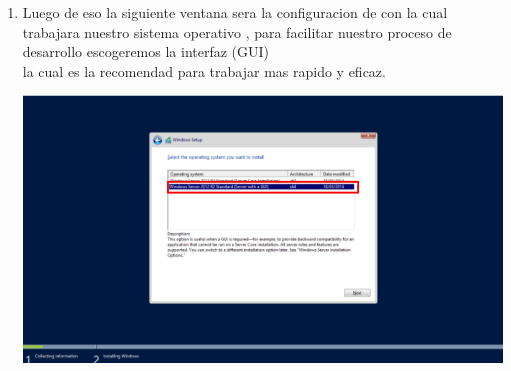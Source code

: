 \begin{enumerate}[1.]
	\item Luego de eso la siguiente ventana sera la configuracion de con la cual trabajara nuestro sistema operativo , para facilitar nuestro proceso de desarrollo escogeremos la interfaz (GUI) 		\\la cual es la recomendad para trabajar mas rapido y eficaz.\\
	\begin{center}
	\includegraphics[width=18cm]{./Imagenes/ang7} 
	\end{center}
	


	
\end{enumerate} 
